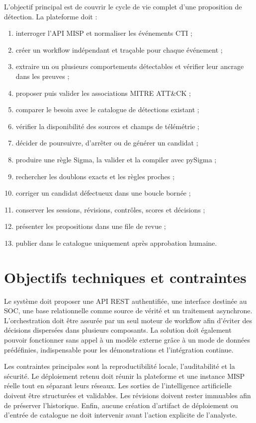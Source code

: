 L'objectif principal est de couvrir le cycle de vie complet d'une proposition de détection. La plateforme doit :
\begin{enumerate}[leftmargin=1.2cm]
    \item interroger l'API MISP et normaliser les événements CTI ;
    \item créer un workflow indépendant et traçable pour chaque événement ;
    \item extraire un ou plusieurs comportements détectables et vérifier leur ancrage dans les preuves ;
    \item proposer puis valider les associations MITRE ATT\&CK ;
    \item comparer le besoin avec le catalogue de détections existant ;
    \item vérifier la disponibilité des sources et champs de télémétrie ;
    \item décider de poursuivre, d'arrêter ou de générer un candidat ;
    \item produire une règle Sigma, la valider et la compiler avec pySigma ;
    \item rechercher les doublons exacts et les règles proches ;
    \item corriger un candidat défectueux dans une boucle bornée ;
    \item conserver les sessions, révisions, contrôles, scores et décisions ;
    \item présenter les propositions dans une file de revue ;
    \item publier dans le catalogue uniquement après approbation humaine.
\end{enumerate}

\section{Objectifs techniques et contraintes}

Le système doit proposer une API REST authentifiée, une interface destinée au SOC, une base relationnelle comme source de vérité et un traitement asynchrone. L'orchestration doit être assurée par un seul moteur de workflow afin d'éviter des décisions dispersées dans plusieurs composants. La solution doit également pouvoir fonctionner sans appel à un modèle externe grâce à un mode de données prédéfinies, indispensable pour les démonstrations et l'intégration continue.

Les contraintes principales sont la reproductibilité locale, l'auditabilité et la sécurité. Le déploiement retenu doit réunir la plateforme et une instance MISP réelle tout en séparant leurs réseaux. Les sorties de l'intelligence artificielle doivent être structurées et validables. Les révisions doivent rester immuables afin de préserver l'historique. Enfin, aucune création d'artifact de déploiement ou d'entrée de catalogue ne doit intervenir avant l'action explicite de l'analyste.

